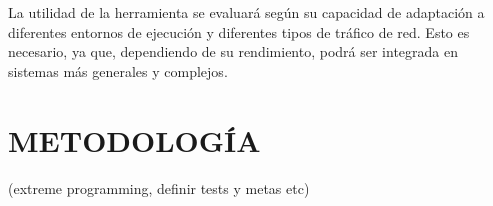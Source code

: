 La utilidad de la herramienta se evaluará según su capacidad de adaptación a diferentes entornos de ejecución y diferentes tipos de tráfico de red. Esto es necesario, ya que, dependiendo de su rendimiento, podrá ser integrada en sistemas más generales y complejos.

\section*{METODOLOGÍA}

(extreme programming, definir tests y metas etc)